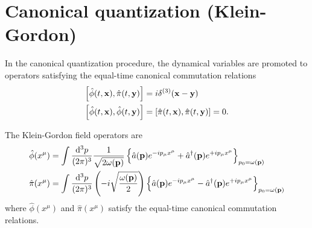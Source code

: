 \section{Canonical quantization (Klein-Gordon)}

\begin{definition}
	In the canonical quantization procedure, the dynamical variables are promoted to operators satisfying the equal-time canonical commutation relations
	\begin{align}
		\comm{\hat\phi(t,\vb{x})}{\hat\pi(t,\vb{y})}
		&=
		i\delta^{(3)}(\vb{x}-\vb{y})
		\\
		\comm{\hat\phi(t,\vb{x})}{\hat\phi(t,\vb{y})}
		&=
		\comm{\hat\pi(t,\vb{x})}{\hat\pi(t,\vb{y})}
		=
		0
		\label{eq:qkg_comm_pm}
		.
	\end{align}
\end{definition}
\begin{corollary}
	The Klein-Gordon field operators are
	\begin{align}
		\hat\phi(x^\mu)
		&=
		\int\frac{\dd[3]{p}}{(2\pi)^3}
		\frac{1}{\sqrt{2\omega(\vb{p})}}
		\left\{
			\hat{a}(\vb{p})
			e^{-ip_\mu x^\mu}
			+
			\hat{a}^\dagger(\vb{p})
			e^{+ip_\mu x^\mu}
		\right\}_{p_0=\omega(\vb{p})}
		\label{eq:qkg_pos}
		\\
		\hat\pi(x^\mu)
		&=
		\int\frac{\dd[3]{p}}{(2\pi)^3}
		\left(-i\sqrt{\frac{\omega(\vb{p})}{2}}\right)
		\left\{
			\hat{a}(\vb{p})
			e^{-ip_\mu x^\mu}
			-
			\hat{a}^\dagger(\vb{p})
			e^{+ip_\mu x^\mu}
		\right\}_{p_0=\omega(\vb{p})}
		\label{eq:qkg_mom}
	\end{align}
	where $\hat\phi(x^\mu)$ and $\hat\pi(x^\mu)$ satisfy the equal-time canonical commutation relations.
\end{corollary}

